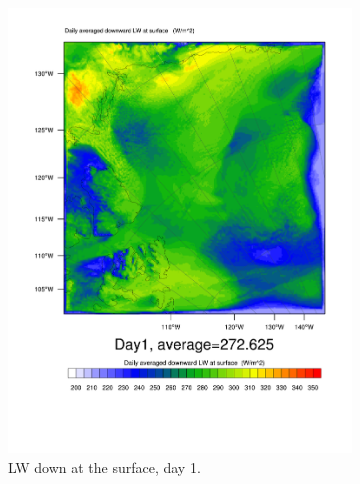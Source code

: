 \begin{figure}
	\begin{subfigure}{0.48\textwidth}
		\centering
		\includegraphics[width=\textwidth]{results/control/GLW_Day1.pdf}
		\caption{LW down at the surface, day 1.}
		\label{subfig:glw_r1Day1}
	\end{subfigure}
	\quad
	\begin{subfigure}{0.48\textwidth}
		\centering

\end{subfigure}
\end{figure}

